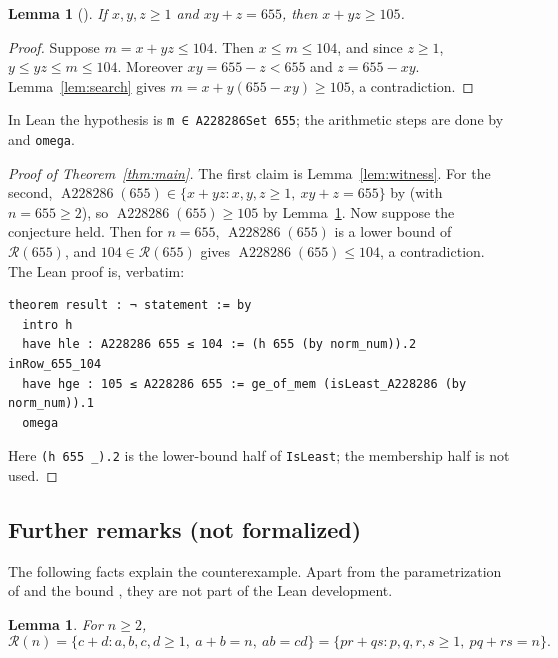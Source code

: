 \documentclass[11pt]{amsart}
\theoremstyle{plain}
\newtheorem{lemma}[theorem]{Lemma}
\theoremstyle{definition}
\newcommand{\R}{\mathcal{R}}
\newcommand{\Aa}{\operatorname{A228286}}
\begin{document}
\begin{lemma}[]\label{lem:lower}
If $x,y,z\ge1$ and $xy+z=655$, then $x+yz\ge105$.
\end{lemma}

\begin{proof}
Suppose $m=x+yz\le104$. Then $x\le m\le104$, and since $z\ge1$, $y\le yz\le m\le104$. Moreover $xy=655-z<655$ and $z=655-xy$. Lemma~\ref{lem:search} gives $m=x+y(655-xy)\ge105$, a contradiction.
\end{proof}

In Lean the hypothesis is \texttt{m ∈ A228286Set 655}; the arithmetic steps are done by  and \texttt{omega}.

\begin{proof}[Proof of Theorem~\ref{thm:main}]
The first claim is Lemma~\ref{lem:witness}. For the second, $\Aa(655)\in\{x+yz:x,y,z\ge1,\ xy+z=655\}$ by  (with $n=655\ge2$), so $\Aa(655)\ge105$ by Lemma~\ref{lem:lower}. Now suppose the conjecture held. Then for $n=655$, $\Aa(655)$ is a lower bound of $\R(655)$, and $104\in\R(655)$ gives $\Aa(655)\le104$, a contradiction. The Lean proof is, verbatim:
\begin{lstlisting}
theorem result : ¬ statement := by
  intro h
  have hle : A228286 655 ≤ 104 := (h 655 (by norm_num)).2 inRow_655_104
  have hge : 105 ≤ A228286 655 := ge_of_mem (isLeast_A228286 (by norm_num)).1
  omega
\end{lstlisting}
Here \texttt{(h 655 \_).2} is the lower-bound half of \texttt{IsLeast}; the membership half is not used.
\end{proof}

\subsection{Further remarks (not formalized)}\label{sec:remarks}

The following facts explain the counterexample. Apart from the parametrization of  and the bound , they are not part of the Lean development.

\begin{lemma}\label{lem:param}
For $n\ge2$,
\[
  \R(n)=\{c+d: a,b,c,d\ge1,\ a+b=n,\ ab=cd\}=\{pr+qs: p,q,r,s\ge1,\ pq+rs=n\}.
\]
\end{lemma}
\end{document}
